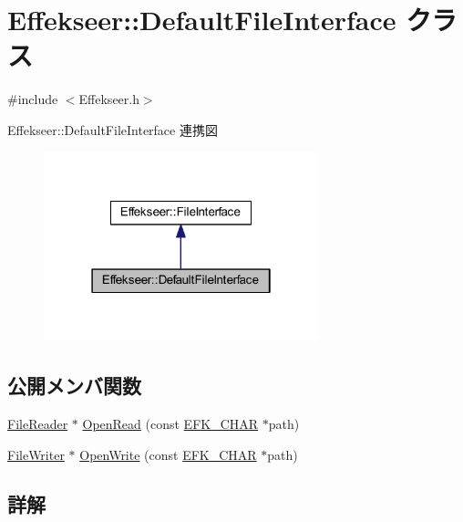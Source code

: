 \hypertarget{class_effekseer_1_1_default_file_interface}{}\section{Effekseer\+:\+:Default\+File\+Interface クラス}
\label{class_effekseer_1_1_default_file_interface}


{\ttfamily \#include $<$Effekseer.\+h$>$}



Effekseer\+:\+:Default\+File\+Interface 連携図\nopagebreak
\begin{figure}[H]
\begin{center}
\leavevmode
\includegraphics[width=226pt]{class_effekseer_1_1_default_file_interface__coll__graph}
\end{center}
\end{figure}
\subsection*{公開メンバ関数}
\begin{DoxyCompactItemize}
\item 
\mbox{\hyperlink{class_effekseer_1_1_file_reader}{File\+Reader}} $\ast$ \mbox{\hyperlink{class_effekseer_1_1_default_file_interface_a03d6224d1eb0124a21f42c578e447d51}{Open\+Read}} (const \mbox{\hyperlink{_effekseer_8h_a50b026abea014b47854bcd835b3b6233}{E\+F\+K\+\_\+\+C\+H\+AR}} $\ast$path)
\item 
\mbox{\hyperlink{class_effekseer_1_1_file_writer}{File\+Writer}} $\ast$ \mbox{\hyperlink{class_effekseer_1_1_default_file_interface_aecbcd4350ca701360dcea88a2c5f9c64}{Open\+Write}} (const \mbox{\hyperlink{_effekseer_8h_a50b026abea014b47854bcd835b3b6233}{E\+F\+K\+\_\+\+C\+H\+AR}} $\ast$path)
\end{DoxyCompactItemize}


\subsection{詳解}


